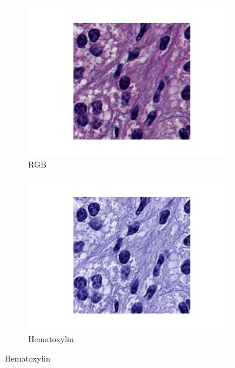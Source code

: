 \documentclass[target=bach,aauheader=,style=]{thud}
\begin{document}
\begin{figure}[h!]
    \centering
    \begin{subfigure}{0.45\textwidth}
        \centering
        \includegraphics[width=\linewidth]{imgs/RGB.jpg}
        \caption{RGB}
    \end{subfigure}
    \hspace{0.2cm}
    \begin{subfigure}{0.45\textwidth}
        \centering
        \includegraphics[width=\linewidth]{imgs/HE.jpg}
        \caption{Hematoxylin}
    \end{subfigure}
    
    \vspace{0.4cm} %
    

\end{figure}
\end{document}
